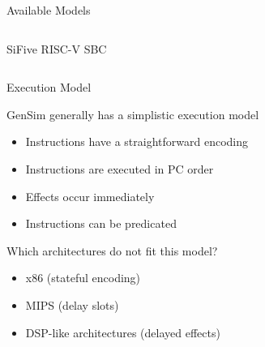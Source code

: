 \begin{frame}{Available Models}
\begin{columns}
\begin{column}{0.4\textwidth}
{\tiny{SiFive RISC-V SBC}
}

\end{column}
\end{columns}

\end{frame}

\begin{frame}{Execution Model}

\begin{minipage}[t][0.4\textheight]{\textwidth}
GenSim generally has a simplistic execution model
\begin{itemize}
	\item Instructions have a straightforward encoding
	\item Instructions are executed in PC order
	\item Effects occur immediately
	\item Instructions can be predicated
\end{itemize}
\end{minipage}

\pause

\begin{minipage}[t][0.4\textheight]{\textwidth}
Which architectures do not fit this model?
\begin{itemize}
	\item x86 (stateful encoding)
	\item MIPS (delay slots)
	\item DSP-like architectures (delayed effects)
\end{itemize}
\end{minipage}

\end{frame}
